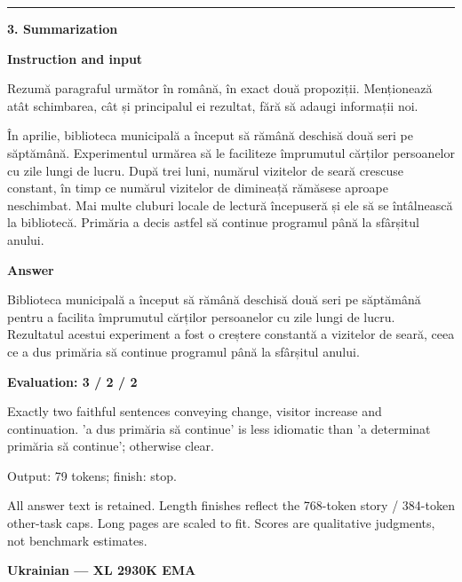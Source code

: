 \documentclass[10pt]{article}
\begin{document}
{\begin{minipage}{\textwidth}
\medskip\hrule\smallskip
{\bfseries 3. Summarization}\par\smallskip
\textbf{Instruction and input}\par Rezumă paragraful următor în română, în exact două propoziții. Menționează atât schimbarea, cât și principalul ei rezultat, fără să adaugi informații noi.
\par\smallskip
În aprilie, biblioteca municipală a început să rămână deschisă două seri pe săptămână. Experimentul urmărea să le faciliteze împrumutul cărților persoanelor cu zile lungi de lucru. După trei luni, numărul vizitelor de seară crescuse constant, în timp ce numărul vizitelor de dimineață rămăsese aproape neschimbat. Mai multe cluburi locale de lectură începuseră și ele să se întâlnească la bibliotecă. Primăria a decis astfel să continue programul până la sfârșitul anului.\par\smallskip
\textbf{Answer}\par Biblioteca municipală a început să rămână deschisă două seri pe săptămână pentru a facilita împrumutul cărților persoanelor cu zile lungi de lucru. Rezultatul acestui experiment a fost o creștere constantă a vizitelor de seară, ceea ce a dus primăria să continue programul până la sfârșitul anului.\par\smallskip
\textbf{Evaluation: 3 / 2 / 2}\par Exactly two faithful sentences conveying change, visitor increase and continuation. 'a dus primăria să continue' is less idiomatic than 'a determinat primăria să continue'; otherwise clear.
\par {\color{gray} Output: 79 tokens; finish: stop.}\par
\medskip\footnotesize All answer text is retained. Length finishes reflect the 768-token story / 384-token other-task caps. Long pages are scaled to fit. Scores are qualitative judgments, not benchmark estimates.
\end{minipage}}%
\noindent\ifdim\dimexpr\ht\languagepage+\dp\languagepage\relax>0.93\textheight%
\resizebox*{!}{0.93\textheight}{\usebox{\languagepage}}%
\else\usebox{\languagepage}\fi%
\clearpage
{\Large\bfseries Ukrainian --- XL 2930K EMA}\par\smallskip
\end{document}
